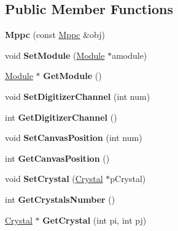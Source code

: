 \subsection*{Public Member Functions}
\begin{DoxyCompactItemize}
\item 
\hypertarget{classMppc_adfebdf8d81f516f4f7a52bacd3441a61}{{\bfseries Mppc} (const \hyperlink{classMppc}{Mppc} \&obj)}\label{classMppc_adfebdf8d81f516f4f7a52bacd3441a61}

\item 
\hypertarget{classMppc_a555b0e14d402d9bbab731d861b7402b4}{void {\bfseries Set\+Module} (\hyperlink{classModule}{Module} $\ast$amodule)}\label{classMppc_a555b0e14d402d9bbab731d861b7402b4}

\item 
\hypertarget{classMppc_a4c15acca1a26848d60658676f0b4c341}{\hyperlink{classModule}{Module} $\ast$ {\bfseries Get\+Module} ()}\label{classMppc_a4c15acca1a26848d60658676f0b4c341}

\item 
\hypertarget{classMppc_aa6173b1e462ad6e03263b7e318a34b53}{void {\bfseries Set\+Digitizer\+Channel} (int num)}\label{classMppc_aa6173b1e462ad6e03263b7e318a34b53}

\item 
\hypertarget{classMppc_ae28c74edaf329a243ae48361eb655c6b}{int {\bfseries Get\+Digitizer\+Channel} ()}\label{classMppc_ae28c74edaf329a243ae48361eb655c6b}

\item 
\hypertarget{classMppc_a2ef23bc91e21bf79f15cf635934cec04}{void {\bfseries Set\+Canvas\+Position} (int num)}\label{classMppc_a2ef23bc91e21bf79f15cf635934cec04}

\item 
\hypertarget{classMppc_a16bb7273a7d58849a812c923ac26be72}{int {\bfseries Get\+Canvas\+Position} ()}\label{classMppc_a16bb7273a7d58849a812c923ac26be72}

\item 
\hypertarget{classMppc_aa7cc8b6a7e131a7eb9e97b6b3f0a5425}{void {\bfseries Set\+Crystal} (\hyperlink{classCrystal}{Crystal} $\ast$p\+Crystal)}\label{classMppc_aa7cc8b6a7e131a7eb9e97b6b3f0a5425}

\item 
\hypertarget{classMppc_a956d11c9e8edd85c3d1d3f6793488571}{int {\bfseries Get\+Crystals\+Number} ()}\label{classMppc_a956d11c9e8edd85c3d1d3f6793488571}

\item 
\hypertarget{classMppc_a2c36ef1ffbafb2f475d6968b7d7edc6f}{\hyperlink{classCrystal}{Crystal} $\ast$ {\bfseries Get\+Crystal} (int pi, int pj)}\label{classMppc_a2c36ef1ffbafb2f475d6968b7d7edc6f}


\end{DoxyCompactItemize}
